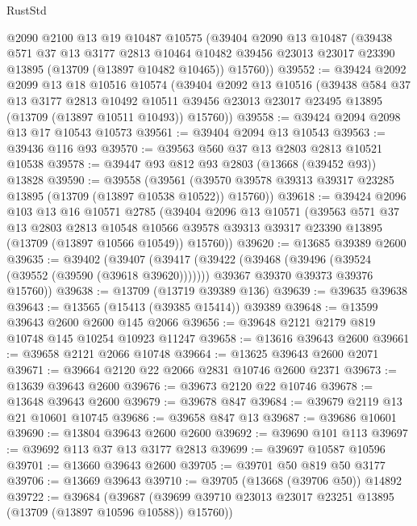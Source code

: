 \begin{lexlean}{RustStd}
\begin{coremodule}
    @2090
    @2100
    @13
    @19
    @10487
    @10575
    (@39404
      @2090
      @13
      @10487
      (@39438
        @571
        @37
        @13
        @3177
        @2813
        @10464
        @10482
        @39456
        @23013
        @23017
        @23390
        @13895
        (@13709 (@13897 @10482 @10465))
        @15760))
@39552 := @39424
    @2092
    @2099
    @13
    @18
    @10516
    @10574
    (@39404
      @2092
      @13
      @10516
      (@39438
        @584
        @37
        @13
        @3177
        @2813
        @10492
        @10511
        @39456
        @23013
        @23017
        @23495
        @13895
        (@13709 (@13897 @10511 @10493))
        @15760))
@39558 := @39424 @2094 @2098 @13 @17 @10543 @10573
@39561 := @39404 @2094 @13 @10543
@39563 := @39436 @116 @93
@39570 := @39563 @560 @37 @13 @2803 @2813 @10521 @10538
@39578 := @39447 @93 @812 @93 @2803 (@13668 (@39452 @93)) @13828
@39590 := @39558
    (@39561 (@39570 @39578 @39313 @39317 @23285 @13895 (@13709 (@13897 @10538 @10522)) @15760))
@39618 := @39424
    @2096
    @103
    @13
    @16
    @10571
    @2785
    (@39404
      @2096
      @13
      @10571
      (@39563
        @571
        @37
        @13
        @2803
        @2813
        @10548
        @10566
        @39578
        @39313
        @39317
        @23390
        @13895
        (@13709 (@13897 @10566 @10549))
        @15760))
@39620 := @13685 @39389 @2600
@39635 := @39402
    (@39407
      (@39417
        (@39422 (@39468 (@39496 (@39524 (@39552 (@39590 (@39618 @39620)))))))
        @39367
        @39370
        @39373
        @39376
        @15760))
@39638 := @13709 (@13719 @39389 @136)
@39639 := @39635 @39638
@39643 := @13565 (@15413 (@39385 @15414)) @39389
@39648 := @13599 @39643 @2600 @2600 @145 @2066
@39656 := @39648 @2121 @2179 @819 @10748 @145 @10254 @10923 @11247
@39658 := @13616 @39643 @2600
@39661 := @39658 @2121 @2066 @10748
@39664 := @13625 @39643 @2600 @2071
@39671 := @39664 @2120 @22 @2066 @2831 @10746 @2600 @2371
@39673 := @13639 @39643 @2600
@39676 := @39673 @2120 @22 @10746
@39678 := @13648 @39643 @2600
@39679 := @39678 @847
@39684 := @39679 @2119 @13 @21 @10601 @10745
@39686 := @39658 @847 @13
@39687 := @39686 @10601
@39690 := @13804 @39643 @2600 @2600
@39692 := @39690 @101 @113
@39697 := @39692 @113 @37 @13 @3177 @2813
@39699 := @39697 @10587 @10596
@39701 := @13660 @39643 @2600
@39705 := @39701 @50 @819 @50 @3177
@39706 := @13669 @39643
@39710 := @39705 (@13668 (@39706 @50)) @14892
@39722 := @39684
    (@39687 (@39699 @39710 @23013 @23017 @23251 @13895 (@13709 (@13897 @10596 @10588)) @15760))

\end{coremodule}
\end{lexlean}
